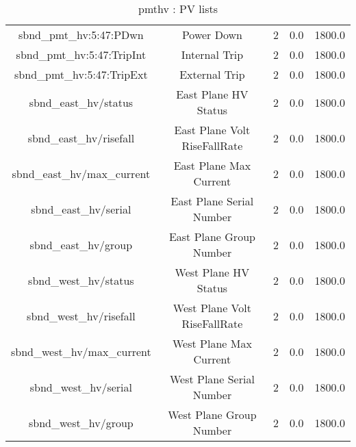 \begin{table}[ptb]
\begin{tabular}{c | c c c c}
sbnd_pmt_hv:5:47:PDwn & Power Down & 2 & 0.0 & 1800.0\\ 
sbnd_pmt_hv:5:47:TripInt & Internal Trip & 2 & 0.0 & 1800.0\\ 
sbnd_pmt_hv:5:47:TripExt & External Trip & 2 & 0.0 & 1800.0\\ 
sbnd_east_hv/status & East Plane HV Status & 2 & 0.0 & 1800.0\\ 
sbnd_east_hv/risefall & East Plane Volt RiseFallRate & 2 & 0.0 & 1800.0\\ 
sbnd_east_hv/max_current & East Plane Max Current & 2 & 0.0 & 1800.0\\ 
sbnd_east_hv/serial & East Plane Serial Number & 2 & 0.0 & 1800.0\\ 
sbnd_east_hv/group & East Plane Group Number & 2 & 0.0 & 1800.0\\ 
sbnd_west_hv/status & West Plane HV Status & 2 & 0.0 & 1800.0\\ 
sbnd_west_hv/risefall & West Plane Volt RiseFallRate & 2 & 0.0 & 1800.0\\ 
sbnd_west_hv/max_current & West Plane Max Current & 2 & 0.0 & 1800.0\\ 
sbnd_west_hv/serial & West Plane Serial Number & 2 & 0.0 & 1800.0\\ 
sbnd_west_hv/group & West Plane Group Number & 2 & 0.0 & 1800.0\\ 

\hline
\end{tabular}
\caption{pmthv : PV lists}
\label{tab:pmthv_PV_list}
\end{table}

